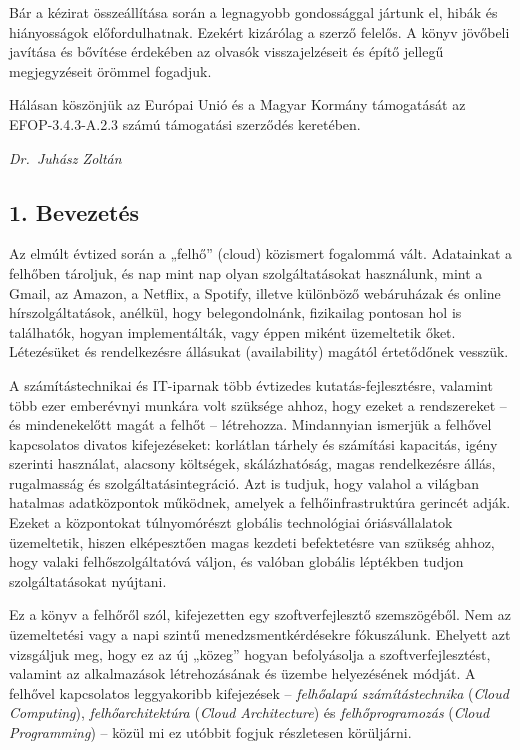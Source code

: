 \documentclass[
]{article}
\begin{document}
Bár a kézirat összeállítása során a legnagyobb gondossággal jártunk el,
hibák és hiányosságok előfordulhatnak. Ezekért kizárólag a szerző
felelős. A könyv jövőbeli javítása és bővítése érdekében az olvasók
visszajelzéseit és építő jellegű megjegyzéseit örömmel fogadjuk.

Hálásan köszönjük az Európai Unió és a Magyar Kormány támogatását az
EFOP-3.4.3-A.2.3 számú támogatási szerződés keretében.

\emph{Dr.~Juhász Zoltán}

\hypertarget{bevezetuxe9s}{%
\subsection{1. Bevezetés}\label{bevezetuxe9s}}

Az elmúlt évtized során a „felhő'' (cloud) közismert fogalommá vált.
Adatainkat a felhőben tároljuk, és nap mint nap olyan szolgáltatásokat
használunk, mint a Gmail, az Amazon, a Netflix, a Spotify, illetve
különböző webáruházak és online hírszolgáltatások, anélkül, hogy
belegondolnánk, fizikailag pontosan hol is találhatók, hogyan
implementálták, vagy éppen miként üzemeltetik őket. Létezésüket és
rendelkezésre állásukat (availability) magától értetődőnek vesszük.

A számítástechnikai és IT-iparnak több évtizedes kutatás-fejlesztésre,
valamint több ezer emberévnyi munkára volt szüksége ahhoz, hogy ezeket a
rendszereket -- és mindenekelőtt magát a felhőt -- létrehozza.
Mindannyian ismerjük a felhővel kapcsolatos divatos kifejezéseket:
korlátlan tárhely és számítási kapacitás, igény szerinti használat,
alacsony költségek, skálázhatóság, magas rendelkezésre állás,
rugalmasság és szolgáltatásintegráció. Azt is tudjuk, hogy valahol a
világban hatalmas adatközpontok működnek, amelyek a felhőinfrastruktúra
gerincét adják. Ezeket a központokat túlnyomórészt globális technológiai
óriásvállalatok üzemeltetik, hiszen elképesztően magas kezdeti
befektetésre van szükség ahhoz, hogy valaki felhőszolgáltatóvá váljon,
és valóban globális léptékben tudjon szolgáltatásokat nyújtani.

Ez a könyv a felhőről szól, kifejezetten egy szoftverfejlesztő
szemszögéből. Nem az üzemeltetési vagy a napi szintű
menedzsmentkérdésekre fókuszálunk. Ehelyett azt vizsgáljuk meg, hogy ez
az új „közeg'' hogyan befolyásolja a szoftverfejlesztést, valamint az
alkalmazások létrehozásának és üzembe helyezésének módját. A felhővel
kapcsolatos leggyakoribb kifejezések -- \emph{felhőalapú
számítástechnika} (\emph{Cloud Computing}), \emph{felhőarchitektúra}
(\emph{Cloud Architecture}) és \emph{felhőprogramozás} (\emph{Cloud
Programming}) -- közül mi ez utóbbit fogjuk részletesen körüljárni.
\end{document}
